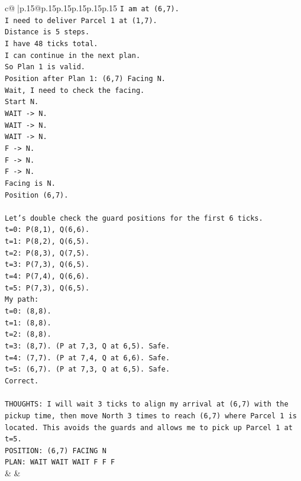 \documentclass{article}
\begin{document}
{\begin{supertabular}{c@{$\;$}|p{.15\linewidth}@{}p{.15\linewidth}p{.15\linewidth}p{.15\linewidth}p{.15\linewidth}p{.15\linewidth}}
{{{\texttt{I am at (6,7).} \\
\texttt{I need to deliver Parcel 1 at (1,7).} \\
\texttt{Distance is 5 steps.} \\
\texttt{I have 48 ticks total.} \\
\texttt{I can continue in the next plan.} \\
\texttt{So Plan 1 is valid.} \\
\texttt{Position after Plan 1: (6,7) Facing N.} \\
\texttt{Wait, I need to check the facing.} \\
\texttt{Start N.} \\
\texttt{WAIT {-}> N.} \\
\texttt{WAIT {-}> N.} \\
\texttt{WAIT {-}> N.} \\
\texttt{F {-}> N.} \\
\texttt{F {-}> N.} \\
\texttt{F {-}> N.} \\
\texttt{Facing is N.} \\
\texttt{Position (6,7).} \\
\\ 
\texttt{Let's double check the guard positions for the first 6 ticks.} \\
\texttt{t=0: P(8,1), Q(6,6).} \\
\texttt{t=1: P(8,2), Q(6,5).} \\
\texttt{t=2: P(8,3), Q(7,5).} \\
\texttt{t=3: P(7,3), Q(6,5).} \\
\texttt{t=4: P(7,4), Q(6,6).} \\
\texttt{t=5: P(7,3), Q(6,5).} \\
\texttt{My path:} \\
\texttt{t=0: (8,8).} \\
\texttt{t=1: (8,8).} \\
\texttt{t=2: (8,8).} \\
\texttt{t=3: (8,7). (P at 7,3, Q at 6,5). Safe.} \\
\texttt{t=4: (7,7). (P at 7,4, Q at 6,6). Safe.} \\
\texttt{t=5: (6,7). (P at 7,3, Q at 6,5). Safe.} \\
\texttt{Correct.} \\
\\ 
\texttt{THOUGHTS: I will wait 3 ticks to align my arrival at (6,7) with the pickup time, then move North 3 times to reach (6,7) where Parcel 1 is located. This avoids the guards and allows me to pick up Parcel 1 at t=5.} \\
\texttt{POSITION: (6,7) FACING N} \\
\texttt{PLAN: WAIT WAIT WAIT F F F} \\
            }
        }
    }
    & & \\ \\


\end{supertabular}}
\end{document}

